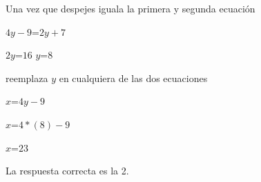\documentclass[11pt, a4paper]{article} %
\theoremstyle{dotlessP}
\theoremstyle{dotlessS}
\begin{document}
\begin{enumerate}[label=\color{dg}\theenumi.]
         Una vez que despejes iguala la primera y segunda ecuación 
         
         \(4y-9\)=\(2y+7\)
         
        \(2y\)=\(16\)
        \(y\)=\(8\)
        
        reemplaza \(y\) en cualquiera de las dos ecuaciones 
        
        \(x\)=\(4y-9\)
        
        \(x\)=\(4*(8)-9\) 
        
         \(x\)=\(23\)
        
        
     
		{\color{dh}La respuesta correcta es la 2.}
        


\end{enumerate}
\end{document}

